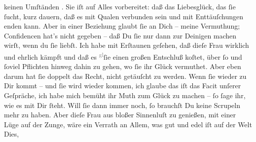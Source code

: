 \begin{ledgroupsized}[t]{13cm}
               keinen Umſtänden \label{K_L02648-2v}\label{K_L02648-2h}. Sie iſt auf Alles vorbereitet: daß das Liebesglück, das
               ſie ſucht, kurz dauern, daß es mit Qualen verbunden sein und mit Enttäuſchungen enden
               kann. Aber in einer Beziehung glaubt ſie an Dich – meine Vermuthung; {\pb}Confidencen hat’s nicht gegeben –
               daß Du ſie nur dann zur Deinigen machen wirſt, wenn du ſie liebſt. Ich habe mit Erſtaunen geſehen,
               daß dieſe Frau wirklich und
               ehrlich kämpft und daß es \substVorne{}\textsuperscript{\textcolor{gray}{gl}}\substDazwischen{}ſie\substHinten{} einen großen Entschluß koſtet, über ſo und ſoviel Pflichten hinweg dahin zu
               gehen, wo ſie ihr Glück vermuthet. Aber eben darum hat ſie doppelt das Recht, nicht
               getäuſcht zu werden. Wenn ſie wieder zu Dir kommt – und ſie wird wieder kommen, ich
               glaube das iſt das Facit unſerer Geſpräche, ich habe mich bemüht ihr Muth zum Glück
               zu machen – ſo ſage ihr, wie es mit Dir ſteht. Will ſie dann immer noch, ſo brauchſt
               Du keine Scrupeln {\pb}mehr zu haben.
               Aber dieſe Frau aus bloßer
               Sinnenluſt zu genießen, mit einer Lüge auf der Zunge, wäre ein Verrath an Allem, was
               gut und edel iſt auf der Welt{\dotsfour}\pend
           \pstart
           Dies, \label{K_L02648-3v}
\end{ledgroupsized}

